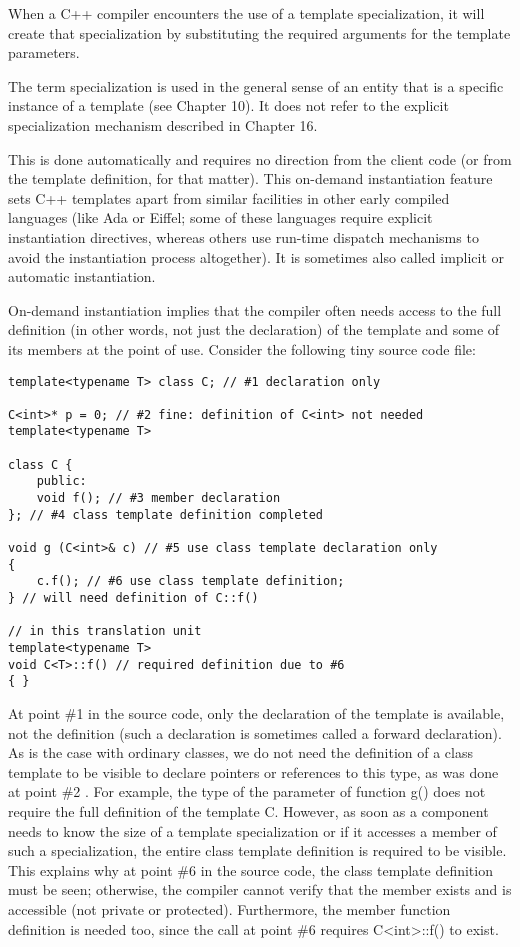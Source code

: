 When a C++ compiler encounters the use of a template specialization, it will create that specialization by substituting the required arguments for the template parameters.

\begin{tcolorbox}[colback=webgreen!5!white,colframe=webgreen!75!black]
\hspace*{0.75cm}The term specialization is used in the general sense of an entity that is a specific instance of a template (see Chapter 10). It does not refer to the explicit specialization mechanism described in Chapter 16.
\end{tcolorbox}

This is done automatically and requires no direction from the client code (or from the template definition, for that matter). This on-demand instantiation feature sets C++ templates apart from similar facilities in other early compiled languages (like Ada or Eiffel; some of these languages require explicit instantiation directives, whereas others use run-time dispatch mechanisms to avoid the instantiation process altogether). It is sometimes also called implicit or automatic instantiation.

On-demand instantiation implies that the compiler often needs access to the full definition (in other words, not just the declaration) of the template and some of its members at the point of use. Consider the following tiny source code file:

\begin{lstlisting}[style=styleCXX]
template<typename T> class C; // #1 declaration only

C<int>* p = 0; // #2 fine: definition of C<int> not needed
template<typename T>

class C {
	public:
	void f(); // #3 member declaration
}; // #4 class template definition completed

void g (C<int>& c) // #5 use class template declaration only
{
	c.f(); // #6 use class template definition;
} // will need definition of C::f()

// in this translation unit
template<typename T>
void C<T>::f() // required definition due to #6
{ }
\end{lstlisting}

At point \#1 in the source code, only the declaration of the template is available, not the definition (such a declaration is sometimes called a forward declaration). As is the case with ordinary classes, we do not need the definition of a class template to be visible to declare pointers or references to this type, as was done at point \#2 . For example, the type of the parameter of function g() does not require the full definition of the template C. However, as soon as a component needs to know the size of a template specialization or if it accesses a member of such a specialization, the entire class template definition is required to be visible. This explains why at point \#6 in the source code, the class template definition must be seen; otherwise, the compiler cannot verify that the member exists and is accessible (not private or protected). Furthermore, the member function definition is needed too, since the call at point \#6 requires C<int>::f() to exist.

